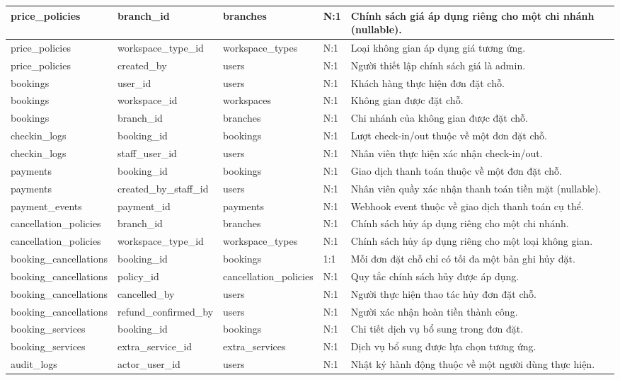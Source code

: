 \begin{longtable}{|p{3.2cm}|p{2.8cm}|p{2.8cm}|p{0.9cm}|p{3.6cm}|}
\hline
price\_\allowbreak policies & branch\_id & branches & N:1 & Chính sách giá áp dụng riêng cho một chi nhánh (nullable). \\
\hline
price\_\allowbreak policies & workspace\_type\_id & workspace\_\allowbreak types & N:1 & Loại không gian áp dụng giá tương ứng. \\
\hline
price\_\allowbreak policies & created\_by & users & N:1 & Người thiết lập chính sách giá là admin. \\
\hline
bookings & user\_id & users & N:1 & Khách hàng thực hiện đơn đặt chỗ. \\
\hline
bookings & workspace\_id & workspaces & N:1 & Không gian được đặt chỗ. \\
\hline
bookings & branch\_id & branches & N:1 & Chi nhánh của không gian được đặt chỗ. \\
\hline
checkin\_logs & booking\_id & bookings & N:1 & Lượt check-in/out thuộc về một đơn đặt chỗ. \\
\hline
checkin\_logs & staff\_user\_id & users & N:1 & Nhân viên thực hiện xác nhận check-in/out. \\
\hline
payments & booking\_id & bookings & N:1 & Giao dịch thanh toán thuộc về một đơn đặt chỗ. \\
\hline
payments & created\_by\_staff\_id & users & N:1 & Nhân viên quầy xác nhận thanh toán tiền mặt (nullable). \\
\hline
payment\_events & payment\_id & payments & N:1 & Webhook event thuộc về giao dịch thanh toán cụ thể. \\
\hline
cancellation\_\allowbreak policies & branch\_id & branches & N:1 & Chính sách hủy áp dụng riêng cho một chi nhánh. \\
\hline
cancellation\_\allowbreak policies & workspace\_type\_id & workspace\_\allowbreak types & N:1 & Chính sách hủy áp dụng riêng cho một loại không gian. \\
\hline
booking\_\allowbreak cancellations & booking\_id & bookings & 1:1 & Mỗi đơn đặt chỗ chỉ có tối đa một bản ghi hủy đặt. \\
\hline
booking\_\allowbreak cancellations & policy\_id & cancellation\_\allowbreak policies & N:1 & Quy tắc chính sách hủy được áp dụng. \\
\hline
booking\_\allowbreak cancellations & cancelled\_by & users & N:1 & Người thực hiện thao tác hủy đơn đặt chỗ. \\
\hline
booking\_\allowbreak cancellations & refund\_\allowbreak confirmed\_\allowbreak by & users & N:1 & Người xác nhận hoàn tiền thành công. \\
\hline
booking\_services & booking\_id & bookings & N:1 & Chi tiết dịch vụ bổ sung trong đơn đặt. \\
\hline
booking\_services & extra\_service\_id & extra\_services & N:1 & Dịch vụ bổ sung được lựa chọn tương ứng. \\
\hline
audit\_logs & actor\_user\_id & users & N:1 & Nhật ký hành động thuộc về một người dùng thực hiện. \\
\hline
\end{longtable}

